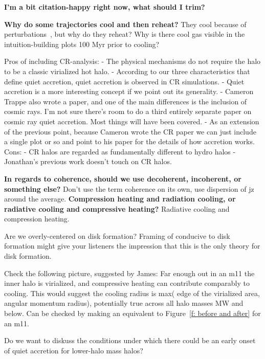 \documentclass[fleqn,usenatbib]{mnras}
\begin{document}
\textbf{I'm a bit citation-happy right now, what should I trim?}

\textbf{Why do some trajectories cool and then reheat?}
They cool because of perturbations~\citep{Esmerian2020}, but why do they reheat?
Why is there cool gas visible in the intuition-building plots 100 Myr prior to cooling?

Pros of including CR-analysis:
- The physical mechanisms do not require the halo to be a classic virialized hot halo.
- According to our three characteristics that define quiet accretion, quiet accretion is observed in CR simulations.
- Quiet accretion is a more interesting concept if we point out its generality.
- Cameron Trappe also wrote a paper, and one of the main differences is the inclusion of cosmic rays. I'm not sure there's room to do a third entirely separate paper on cosmic ray quiet accretion. Most things will have been covered.
- As an extension of the previous point, because Cameron wrote the CR paper we can just include a single plot or so and point to his paper for the details of how accretion works.
Cons:
- CR halos are regarded as fundamentally different to hydro halos
- Jonathan's previous work doesn't touch on CR halos.

\textbf{In regards to coherence, should we use decoherent, incoherent, or something else?}
Don't use the term coherence on its own, use dispersion of jz around the average.
\textbf{Compression heating and radiation cooling, or radiative cooling and compressive heating?}
Radiative cooling and compression heating.

Are we overly-centered on disk formation?
Framing of conducive to disk formation might give your listeners the impression that this is the only theory for disk formation.

Check the following picture, suggested by James:
Far enough out in an m11 the inner halo is virialized, and compressive heating can contribute comparably to cooling.
This would suggest the cooling radius is max( edge of the virialized area, angular momentum radius), potentially true across all halo masses MW and below.
Can be checked by making an equivalent to Figure~\ref{f: before and after} for an m11.

Do we want to diskuss the conditions under which there could be an early onset of quiet accretion for lower-halo mass halos?
\end{document}
